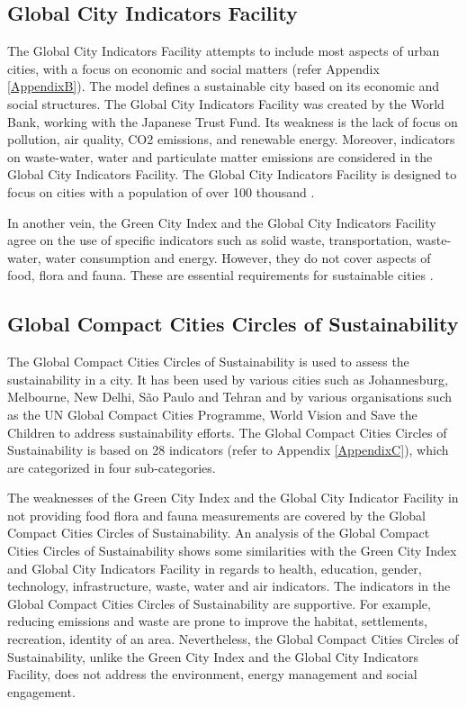 \subsection{Global City Indicators Facility}

The Global City Indicators Facility attempts to include most aspects of urban cities, with a focus on economic and social matters (refer Appendix \ref{AppendixB}). The model defines a sustainable city based on its economic and social structures. The Global City Indicators Facility was created by the World Bank, working with the Japanese Trust Fund. Its weakness is the lack of focus on pollution, air quality, CO2 emissions, and renewable energy. Moreover, indicators on waste-water, water and particulate matter emissions are considered in the Global City Indicators Facility. The Global City Indicators Facility is designed to focus on cities with a population of over 100 thousand \cite{Mccarney2009}.

In another vein, the Green City Index and the Global City Indicators Facility agree on the use of specific indicators such as solid waste, transportation, waste-water, water consumption and energy. However, they do not cover aspects of food, flora and fauna. These are essential requirements for sustainable cities \cite{Ackerman2014, Opitz2016, Specht2014}.

\subsection{Global Compact Cities Circles of Sustainability}

The Global Compact Cities Circles of Sustainability is used to assess the sustainability in a city. It has been used by various cities such as Johannesburg, Melbourne, New Delhi, São Paulo and Tehran and by various organisations such as the UN Global Compact Cities Programme, World Vision and Save the Children to address sustainability efforts. The Global Compact Cities Circles of Sustainability is based on 28 indicators (refer to Appendix \ref{AppendixC}), which are categorized in four sub-categories.

The weaknesses of the Green City Index and the Global City Indicator Facility in not providing food flora and fauna measurements are covered by the Global Compact Cities Circles of Sustainability. An analysis of the Global Compact Cities Circles of Sustainability shows some similarities with the Green City Index and Global City Indicators Facility in regards to health, education, gender, technology, infrastructure, waste, water and air indicators. The indicators in the Global Compact Cities Circles of Sustainability are supportive. For example, reducing emissions and waste are prone to improve the habitat, settlements, recreation, identity of an area. Nevertheless, the Global Compact Cities Circles of Sustainability, unlike the Green City Index and the Global City Indicators Facility, does not address the environment, energy management and social engagement.

